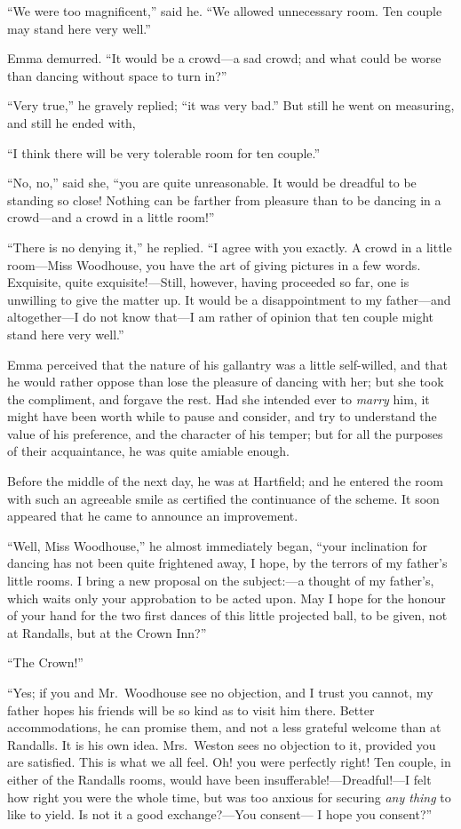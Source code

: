 ``We were too magnificent,'' said he.  ``We allowed unnecessary room.
Ten couple may stand here very well.''

Emma demurred.  ``It would be a crowd---a sad crowd; and what could
be worse than dancing without space to turn in?''

``Very true,'' he gravely replied; ``it was very bad.''  But still he
went on measuring, and still he ended with,

``I think there will be very tolerable room for ten couple.''

``No, no,'' said she, ``you are quite unreasonable.  It would be dreadful
to be standing so close!  Nothing can be farther from pleasure
than to be dancing in a crowd---and a crowd in a little room!''

``There is no denying it,'' he replied.  ``I agree with you exactly.
A crowd in a little room---Miss Woodhouse, you have the art of giving
pictures in a few words.  Exquisite, quite exquisite!---Still, however,
having proceeded so far, one is unwilling to give the matter up.
It would be a disappointment to my father---and altogether---I do
not know that---I am rather of opinion that ten couple might stand
here very well.''

Emma perceived that the nature of his gallantry was a little
self-willed, and that he would rather oppose than lose the pleasure
of dancing with her; but she took the compliment, and forgave
the rest.  Had she intended ever to \emph{marry} him, it might have been
worth while to pause and consider, and try to understand the value
of his preference, and the character of his temper; but for
all the purposes of their acquaintance, he was quite amiable enough.

Before the middle of the next day, he was at Hartfield; and he entered
the room with such an agreeable smile as certified the continuance
of the scheme.  It soon appeared that he came to announce an improvement.

``Well, Miss Woodhouse,'' he almost immediately began, ``your inclination
for dancing has not been quite frightened away, I hope, by the
terrors of my father's little rooms.  I bring a new proposal
on the subject:---a thought of my father's, which waits only your
approbation to be acted upon.  May I hope for the honour of your
hand for the two first dances of this little projected ball,
to be given, not at Randalls, but at the Crown Inn?''

``The Crown!''

``Yes; if you and Mr.\ Woodhouse see no objection, and I trust you cannot,
my father hopes his friends will be so kind as to visit him there.
Better accommodations, he can promise them, and not a less grateful
welcome than at Randalls.  It is his own idea.  Mrs.\ Weston sees
no objection to it, provided you are satisfied.  This is what we
all feel.  Oh! you were perfectly right!  Ten couple, in either of
the Randalls rooms, would have been insufferable!---Dreadful!---I felt
how right you were the whole time, but was too anxious for securing
\emph{any thing} to like to yield.  Is not it a good exchange?---You consent---%
I hope you consent?''


